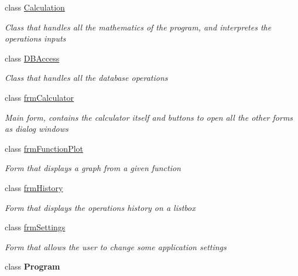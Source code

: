 \begin{DoxyCompactItemize}
\item 
class \hyperlink{class_scientific___calculator_1_1_calculation}{Calculation}
\begin{DoxyCompactList}\small\item\em Class that handles all the mathematics of the program, and interpretes the operations inputs \end{DoxyCompactList}\item 
class \hyperlink{class_scientific___calculator_1_1_d_b_access}{D\+B\+Access}
\begin{DoxyCompactList}\small\item\em Class that handles all the database operations \end{DoxyCompactList}\item 
class \hyperlink{class_scientific___calculator_1_1frm_calculator}{frm\+Calculator}
\begin{DoxyCompactList}\small\item\em Main form, contains the calculator itself and buttons to open all the other forms as dialog windows \end{DoxyCompactList}\item 
class \hyperlink{class_scientific___calculator_1_1frm_function_plot}{frm\+Function\+Plot}
\begin{DoxyCompactList}\small\item\em Form that displays a graph from a given function \end{DoxyCompactList}\item 
class \hyperlink{class_scientific___calculator_1_1frm_history}{frm\+History}
\begin{DoxyCompactList}\small\item\em Form that displays the operations history on a listbox \end{DoxyCompactList}\item 
class \hyperlink{class_scientific___calculator_1_1frm_settings}{frm\+Settings}
\begin{DoxyCompactList}\small\item\em Form that allows the user to change some application settings \end{DoxyCompactList}\item 
class {\bfseries Program}
\end{DoxyCompactItemize}
